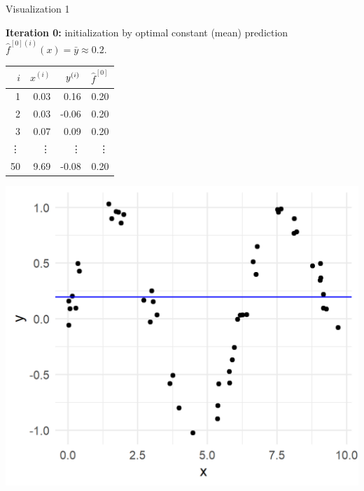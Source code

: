 \begin{vbframe}{Visualization 1}
\begin{footnotesize}


\textbf{Iteration 0:} initialization by optimal constant (mean) prediction 
$\hat f^{[0](i)}(x) = \bar{y} \approx 0.2$.

\vfill

\begin{minipage}[c]{0.35\textwidth}
  \vspace{0pt}%
  \scriptsize
  \centering
  \begin{tabular}{r|r|r|r}
    $i$ & $x^{(i)}$ & $y^{(i)}$ & $\hat{f}^{[0]}$ \\
    \hline
    1 & 0.03 & 0.16 & 0.20 \\
    2 & 0.03 & -0.06 & 0.20 \\
    3 & 0.07 & 0.09 & 0.20 \\
    \vdots & \vdots & \vdots & \vdots \\
    50 & 9.69 & -0.08 & 0.20 \\
  \end{tabular}
\end{minipage}%
\begin{minipage}[c]{0.05\textwidth}
  \phantom{foo}
\end{minipage}%
\begin{minipage}[c]{0.6\textwidth}
  \vspace{0pt}%
  \includegraphics{figure/gbm_anim_init.png}
\end{minipage}%


\end{footnotesize}
\end{vbframe}
